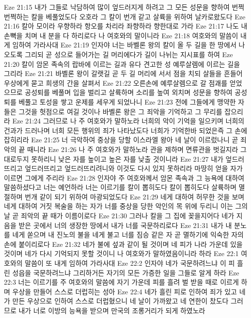 Eze 21:15  내가 그들로 낙담하여 많이 엎드러지게 하려고 그 모든 성문을 향하여 번쩍번쩍하는 칼을 베풀었도다 오호라 그 칼이 번개 같고 살륙을 위하여 날카로왔도다
Eze 21:16  칼아 모이라 우향하라 항오를 차리라 좌향하라 향한대로 가라
Eze 21:17  나도 내 손뼉을 치며 내 분을 다 하리로다 나 여호와의 말이니라
Eze 21:18  여호와의 말씀이 내게 임하여 가라사대
Eze 21:19  인자야 너는 바벨론 왕의 칼이 올 두 길을 한 땅에서 나오도록 그리되 곧 성으로 들어가는 길 머리에다가 길이 나뉘는 지시표를 하여
Eze 21:20  칼이 암몬 족속의 랍바에 이르는 길과 유다 견고한 성 예루살렘에 이르는 길을 그리라
Eze 21:21  바벨론 왕이 갈랫길 곧 두 길 머리에 서서 점을 치되 살들을 흔들어 우상에게 묻고 희생의 간을 살펴서
Eze 21:22  오른손에 예루살렘으로 갈 점괘를 얻었으므로 공성퇴를 베풀며 입을 벌리고 살륙하며 소리를 높여 외치며 성문을 향하여 공성퇴를 베풀고 토성을 쌓고 운제를 세우게 되었나니
Eze 21:23  전에 그들에게 맹약한 자들은 그것을 헛점으로 여길 것이나 바벨론 왕은 그 죄악을 기억하고 그 무리를 잡으리라
Eze 21:24  그러므로 나 주 여호와가 말하노라 너희의 악이 기억을 일으키며 너희의 건과가 드러나며 너희 모든 행위의 죄가 나타났도다 너희가 기억한바 되었은즉 그 손에 잡히리라
Eze 21:25  너 극악하여 중상을 당할 이스라엘 왕아 네 날이 이르렀나니 곧 죄악의 끝 때니라
Eze 21:26  나 주 여호와가 말하노라 관을 제하며 면류관을 벗길지라 그대로두지 못하리니 낮은 자를 높이고 높은 자를 낮출 것이니라
Eze 21:27  내가 엎드러뜨리고 엎드러뜨리고 엎드러뜨리려니와 이것도 다시 있지 못하리라 마땅히 얻을 자가 이르면 그에게 주리라
Eze 21:28  인자야 주 여호와께서 암몬 족속과 그 능욕에 대하여 말씀하셨다고 너는 예언하라 너는 이르기를 칼이 뽑히도다 칼이 뽑히도다 살륙하며 멸절하며 번개 같이 되기 위하여 마광되었도다
Eze 21:29  네게 대하여 허무한 것을 보며 네게 대하여 거짓 복술을 하는 자가 너를 중상을 당한 악인의 목 위에 두리니 이는 그의 날 곧 죄악의 끝 때가 이름이로다
Eze 21:30  그러나 칼을 그 집에 꽂을지어다 네가 지음을 받은 곳에서 너의 생장한 땅에서 내가 너를 국문하리로다
Eze 21:31  내가 내 분노를 네게 쏟으며 내 진노의 불을 네게 불고 너를 짐승 같은 자 곧 멸하기에 익숙한 자의 손에 붙이리로다
Eze 21:32  네가 불에 섶과 같이 될 것이며 네 피가 나라 가운데 있을 것이며 네가 다시 기억되지 못할 것이니 나 여호와가 말하였음이니라 하라
Eze 22:1  여호와의 말씀이 또 내게 임하여 가라사대
Eze 22:2  인자야 네가 국문하려느냐 이 피 흘린 성읍을 국문하려느냐 그리하거든 자기의 모든 가증한 일을 그들로 알게 하라
Eze 22:3  너는 이르기를 주 여호와의 말씀에 자기 가운데 피를 흘려 벌 받을 때로 이르게 하며 우상을 만들어 스스로 더럽히는 성아
Eze 22:4  네가 흘린 피로 인하여 죄가 있고 네가 만든 우상으로 인하여 스스로 더럽혔으니 네 날이 가까왔고 네 연한이 찼도다 그러므로 내가 너로 이방의 능욕을 받으며 만국의 조롱거리가 되게 하였노라
